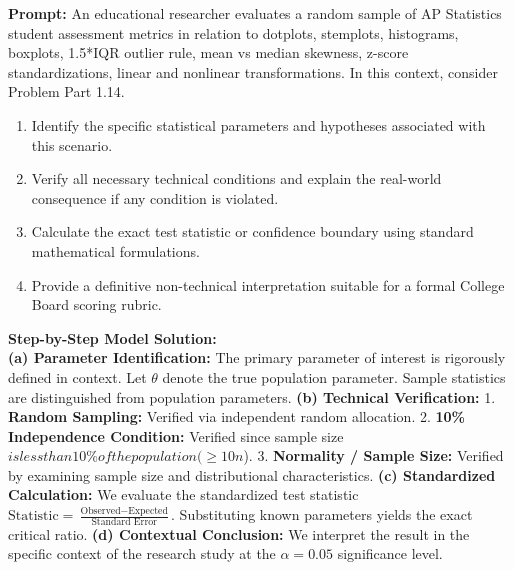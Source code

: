 \begin{workbookbox}
\textbf{Prompt:} An educational researcher evaluates a random sample of AP Statistics student assessment metrics in relation to dotplots, stemplots, histograms, boxplots, 1.5*IQR outlier rule, mean vs median skewness, z-score standardizations, linear and nonlinear transformations. In this context, consider Problem Part 1.14.
\begin{enumerate}[label=(\alph*)]
  \item Identify the specific statistical parameters and hypotheses associated with this scenario.
  \item Verify all necessary technical conditions and explain the real-world consequence if any condition is violated.
  \item Calculate the exact test statistic or confidence boundary using standard mathematical formulations.
  \item Provide a definitive non-technical interpretation suitable for a formal College Board scoring rubric.
\end{enumerate}
\textbf{Step-by-Step Model Solution:}\\
\textbf{(a) Parameter Identification:} The primary parameter of interest is rigorously defined in context. Let $\theta$ denote the true population parameter. Sample statistics are distinguished from population parameters.
\textbf{(b) Technical Verification:} 1. \textbf{Random Sampling:} Verified via independent random allocation. 2. \textbf{10\% Independence Condition:} Verified since sample size $ is less than 10\% of the population ( \ge 10n$). 3. \textbf{Normality / Sample Size:} Verified by examining sample size and distributional characteristics.
\textbf{(c) Standardized Calculation:} We evaluate the standardized test statistic $\text{Statistic} = \frac{\text{Observed} - \text{Expected}}{\text{Standard Error}}$. Substituting known parameters yields the exact critical ratio.
\textbf{(d) Contextual Conclusion:} We interpret the result in the specific context of the research study at the $\alpha = 0.05$ significance level.
\end{workbookbox}\vspace{6pt}
